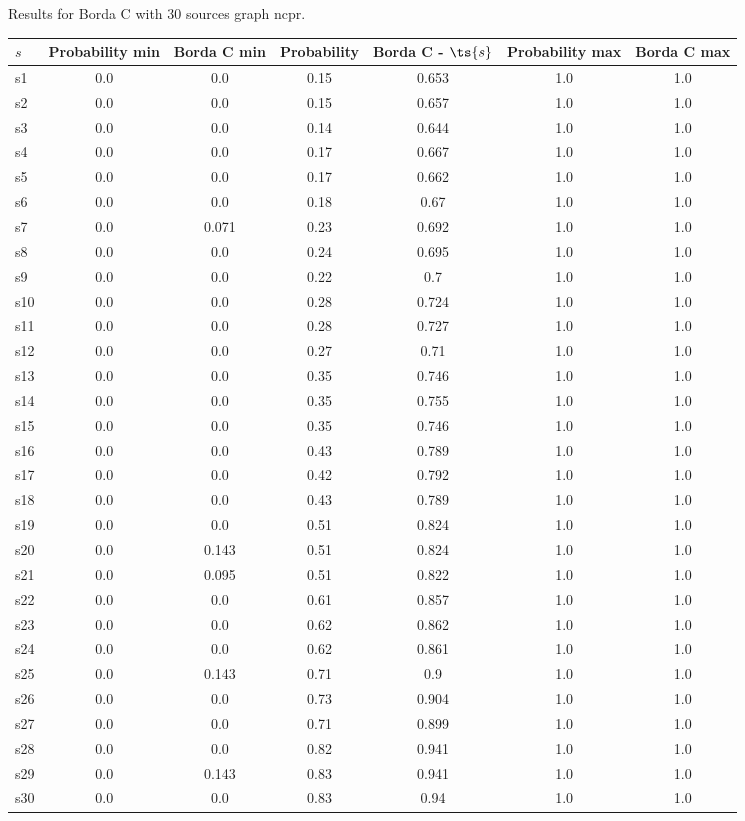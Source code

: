 \documentclass{article}
\begin{document}
\noindent Results for Borda C with 30 sources graph ncpr.

\noindent\begin{tabular}{|l|c|c|c|c|c|c|}
\hline
$s$& Probability min & Borda C min & Probability & Borda C - $\ts{s}$ & Probability max & Borda C max\\
\hline
s1 &0.0 & 0.0 & 0.15 & 0.653 & 1.0 & 1.0\\
\hline
s2 &0.0 & 0.0 & 0.15 & 0.657 & 1.0 & 1.0\\
\hline
s3 &0.0 & 0.0 & 0.14 & 0.644 & 1.0 & 1.0\\
\hline
s4 &0.0 & 0.0 & 0.17 & 0.667 & 1.0 & 1.0\\
\hline
s5 &0.0 & 0.0 & 0.17 & 0.662 & 1.0 & 1.0\\
\hline
s6 &0.0 & 0.0 & 0.18 & 0.67 & 1.0 & 1.0\\
\hline
s7 &0.0 & 0.071 & 0.23 & 0.692 & 1.0 & 1.0\\
\hline
s8 &0.0 & 0.0 & 0.24 & 0.695 & 1.0 & 1.0\\
\hline
s9 &0.0 & 0.0 & 0.22 & 0.7 & 1.0 & 1.0\\
\hline
s10 &0.0 & 0.0 & 0.28 & 0.724 & 1.0 & 1.0\\
\hline
s11 &0.0 & 0.0 & 0.28 & 0.727 & 1.0 & 1.0\\
\hline
s12 &0.0 & 0.0 & 0.27 & 0.71 & 1.0 & 1.0\\
\hline
s13 &0.0 & 0.0 & 0.35 & 0.746 & 1.0 & 1.0\\
\hline
s14 &0.0 & 0.0 & 0.35 & 0.755 & 1.0 & 1.0\\
\hline
s15 &0.0 & 0.0 & 0.35 & 0.746 & 1.0 & 1.0\\
\hline
s16 &0.0 & 0.0 & 0.43 & 0.789 & 1.0 & 1.0\\
\hline
s17 &0.0 & 0.0 & 0.42 & 0.792 & 1.0 & 1.0\\
\hline
s18 &0.0 & 0.0 & 0.43 & 0.789 & 1.0 & 1.0\\
\hline
s19 &0.0 & 0.0 & 0.51 & 0.824 & 1.0 & 1.0\\
\hline
s20 &0.0 & 0.143 & 0.51 & 0.824 & 1.0 & 1.0\\
\hline
s21 &0.0 & 0.095 & 0.51 & 0.822 & 1.0 & 1.0\\
\hline
s22 &0.0 & 0.0 & 0.61 & 0.857 & 1.0 & 1.0\\
\hline
s23 &0.0 & 0.0 & 0.62 & 0.862 & 1.0 & 1.0\\
\hline
s24 &0.0 & 0.0 & 0.62 & 0.861 & 1.0 & 1.0\\
\hline
s25 &0.0 & 0.143 & 0.71 & 0.9 & 1.0 & 1.0\\
\hline
s26 &0.0 & 0.0 & 0.73 & 0.904 & 1.0 & 1.0\\
\hline
s27 &0.0 & 0.0 & 0.71 & 0.899 & 1.0 & 1.0\\
\hline
s28 &0.0 & 0.0 & 0.82 & 0.941 & 1.0 & 1.0\\
\hline
s29 &0.0 & 0.143 & 0.83 & 0.941 & 1.0 & 1.0\\
\hline
s30 &0.0 & 0.0 & 0.83 & 0.94 & 1.0 & 1.0\\
\hline
\end{tabular}\\
\end{document}
